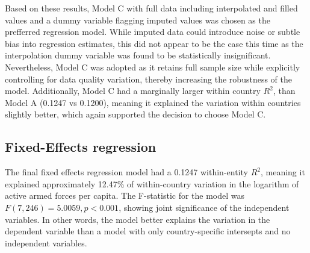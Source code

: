 Based on these results, Model C with full data including interpolated and filled values and a dummy 
variable flagging imputed values was chosen
as the prefferred regression model. While imputed data could introduce noise or subtle bias
into regression estimates, this did not appear to be the case this time as the interpolation dummy 
variable was found to be statistically insignificant. 
Nevertheless, Model C was adopted as it retains full sample size while explicitly controlling 
for data quality variation, thereby increasing the robustness of the model.
Additionally, Model C had a marginally larger within country 
$R^2$, than Model A (0.1247 vs 0.1200), meaning it explained the variation within countries 
slightly better, which again supported the decision to choose Model C.

\subsection{Fixed-Effects regression}

\renewcommand{\arraystretch}{1.3}

The final fixed effects regression model had a 0.1247 within-entity $R^2$, meaning it explained 
approximately 12.47\% of within-country variation in the logarithm of active armed forces per capita.
The F-statistic for the model was $F(7, 246)=5.0059, p<0.001$, showing joint significance of the independent variables.
In other words, the model better explains the variation in the dependent variable than a model with 
only country-specific intersepts and no independent variables. 

